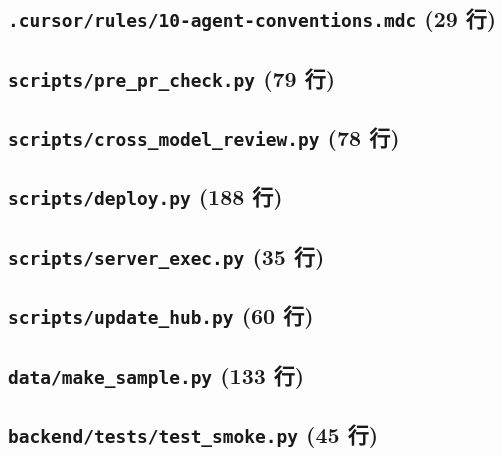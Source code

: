 \subsection*{\texttt{.cursor/rules/10-agent-conventions.mdc} \hfill \normalfont\small (29 行)}


\subsection*{\texttt{scripts/pre\_pr\_check.py} \hfill \normalfont\small (79 行)}


\subsection*{\texttt{scripts/cross\_model\_review.py} \hfill \normalfont\small (78 行)}


\subsection*{\texttt{scripts/deploy.py} \hfill \normalfont\small (188 行)}


\subsection*{\texttt{scripts/server\_exec.py} \hfill \normalfont\small (35 行)}


\subsection*{\texttt{scripts/update\_hub.py} \hfill \normalfont\small (60 行)}


\subsection*{\texttt{data/make\_sample.py} \hfill \normalfont\small (133 行)}


\subsection*{\texttt{backend/tests/test\_smoke.py} \hfill \normalfont\small (45 行)}

